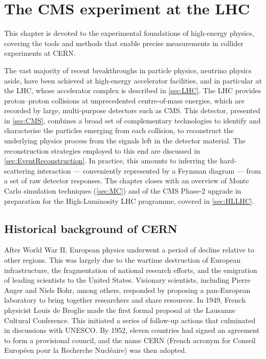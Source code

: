 \chapter{The CMS experiment at the LHC}
\label{ch:chapitre1}
\minitoc

This chapter is devoted to the experimental foundations of high-energy physics, covering the tools and methods that enable precise measurements in collider experiments at CERN.

The vast majority of recent breakthroughs in particle physics, neutrino physics aside, have been achieved at high-energy accelerator facilities, and in particular at the LHC, whose accelerator complex is described in \cref{sec:LHC}. The LHC provides proton--proton collisions at unprecedented centre-of-mass energies, which are recorded by large, multi-purpose detectors such as CMS. This detector, presented in \cref{sec:CMS}, combines a broad set of complementary technologies to identify and characterise the particles emerging from each collision, to reconstruct the underlying physics process from the signals left in the detector material. The reconstruction strategies employed to this end are discussed in \cref{sec:EventReconstruction}. In practice, this amounts to inferring the hard-scattering interaction --- conveniently represented by a Feynman diagram --- from a set of raw detector responses. The chapter closes with an overview of Monte Carlo simulation techniques (\cref{sec:MC}) and of the CMS Phase-2 upgrade in preparation for the High-Luminosity LHC programme, covered in \cref{sec:HLLHC}.


\section{Historical background of CERN}
\label{sec:HistoricalCERN}

After World War II, European physics underwent a period of decline relative to other regions. This was largely due to the wartime destruction of European infrastructure, the fragmentation of national research efforts, and the emigration of leading scientists to the United States. Visionary scientists, including Pierre Auger and Niels Bohr, among others, responded by proposing a pan-European laboratory to bring together researchers and share resources. In 1949, French physicist Louis de Broglie made the first formal proposal at the Lausanne Cultural Conference. This initiated a series of follow-up actions that culminated in discussions with UNESCO. By 1952, eleven countries had signed an agreement to form a provisional council, and the name CERN (French acronym for Conseil Européen pour la Recherche Nucléaire) was then adopted.

